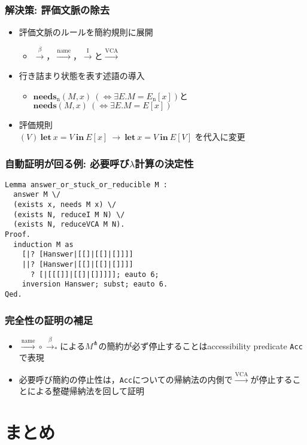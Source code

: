 \documentclass[dvipdfmx,cjk,xcolor=dvipsnames,envcountsect,notheorems,12pt]{beamer}
\theoremstyle{definition}
\newcommand{\LET}[3]{\mathbf{let}~#1=#2~\mathbf{in}~#3}
\newcommand{\EXPANDLET}[1]{#1^\pitchfork}
\newcommand{\FULLBETA}{\xrightarrow{\beta}}
\newcommand{\CALLBYNEEDI}{\xrightarrow{\mathrm{I}}}
\newcommand{\CALLBYNEEDVCA}{\xrightarrow{\mathrm{VCA}}}
\newcommand{\CALLBYNAME}{\xrightarrow{\mathrm{name}}}
\newcommand{\DEMAND}[2]{\mathbf{needs}(#2, #1)}
\newcommand{\STUCK}[2]{\mathbf{needs}_\mathrm{n}(#2, #1)}
\newcommand{\RTCLOS}[1]{#1_*}
\begin{document}
\begin{frame}
	\frametitle{解決策: 評価文脈の除去}
	\begin{itemize}
		\item 評価文脈のルールを簡約規則に展開
			\begin{itemize}
				\item $\FULLBETA$，$\CALLBYNAME$，$\CALLBYNEEDI$と$\CALLBYNEEDVCA$
			\end{itemize}
		\item 行き詰まり状態を表す述語の導入
			\begin{itemize}
				\item $\STUCK{x}{M}~(\iff \exists E. M=E_\mathrm{n}[x])$と$\DEMAND{x}{M}~(\iff \exists E. M=E[x])$
			\end{itemize}
		\item 評価規則\\$(V)~{\LET{x}{V}{E[x]}}~\rightarrow~{\LET{x}{V}{E[V]}}$
			を代入に変更
	\end{itemize}
\end{frame}

\begin{frame}[fragile]
	\frametitle{自動証明が回る例: 必要呼び$\lambda$計算の決定性}
\begin{lstlisting}
Lemma answer_or_stuck_or_reducible M :
  answer M \/
  (exists x, needs M x) \/
  (exists N, reduceI M N) \/
  (exists N, reduceVCA M N).
Proof.
  induction M as
    [|? [Hanswer|[[]|[[]|[]]]]
    ||? [Hanswer|[[]|[[]|[]]]]
      ? [|[[[]]|[[]|[]]]]]; eauto 6;
    inversion Hanswer; subst; eauto 6.
Qed.
\end{lstlisting}
\end{frame}

\begin{frame}
	\frametitle{完全性の証明の補足}
	\begin{itemize}
		\item ${\CALLBYNAME}\circ{\RTCLOS{\FULLBETA}}$による$\EXPANDLET{M}$の簡約が必ず停止することはaccessibility predicate \lstinline|Acc|で表現
		\item 必要呼び簡約の停止性は，\lstinline|Acc|についての帰納法の内側で$\CALLBYNEEDVCA$が停止することによる整礎帰納法を回して証明
	\end{itemize}
\end{frame}

\section{まとめ}
\end{document}
